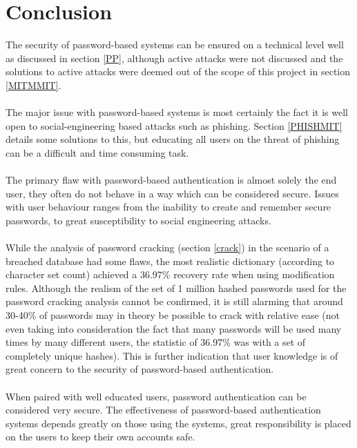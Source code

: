 \documentclass[11pt]{article}
\begin{document}
\section{Conclusion} \label{CONCL}
The security of password-based systems can be ensured on a technical level well as discussed in section \ref{PP}, although active attacks were not discussed and the solutions to active attacks were deemed out of the scope of this project in section \ref{MITMMIT}.\\\\
The major issue with password-based systems is most certainly the fact it is well open to social-engineering based attacks such as phishing. Section \ref{PHISHMIT} details some solutions to this, but educating all users on the threat of phishing can be a difficult and time consuming task.\\\\
The primary flaw with password-based authentication is almost solely the end user, they often do not behave in a way which can be considered secure.
Issues with user behaviour ranges from the inability to create and remember secure passwords, to great susceptibility to social engineering attacks.\\\\
While the analysis of password cracking (section \ref{crack}) in the scenario of a breached database had some flaws, the most realistic dictionary (according to character set count) achieved a 36.97\% recovery rate when using modification rules.
Although the realism of the set of 1 million hashed passwords used for the password cracking analysis cannot be confirmed, it is still alarming that around 30-40\% of passwords may in theory be possible to crack with relative ease (not even taking into consideration the fact that many passwords will be used many times by many different users, the statistic of 36.97\% was with a set of completely unique hashes). This is further indication that user knowledge is of great concern to the security of password-based authentication.\\\\
When paired with well educated users, password authentication can be considered very secure. The effectiveness of password-based authentication systems depends greatly on those using the systems, great responsibility is placed on the users to keep their own accounts safe.



\end{document}
